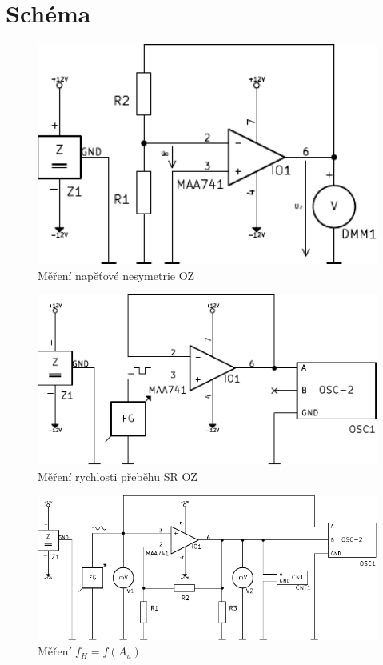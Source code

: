 \section*{Schéma}
  \begin{figure}[H]
    \centering
    \includegraphics[width=15cm]{../img/U_IO.pdf}
    \caption{Měření napěťové nesymetrie OZ}
    \label{sch:1}
  \end{figure}
  
  \begin{figure}[H]
    \centering
    \includegraphics[width=15cm]{../img/SR.pdf}
    \caption{Měření rychlosti přeběhu SR OZ}
    \label{sch:2}
  \end{figure}
  
  \begin{figure}[H]
    \centering
    \includegraphics[width=17cm]{../img/NINZ.pdf}
    \caption{Měření $f_H = f(A_u)$}
    \label{sch:2}
  \end{figure}

